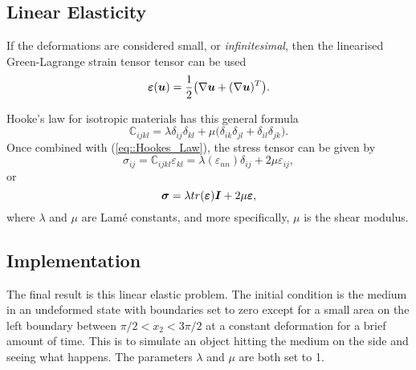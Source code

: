 \subsection{Linear Elasticity}
If the deformations are considered small, or \textit{infinitesimal}, then the linearised Green-Lagrange strain tensor tensor can be used
\begin{equation*}
  \bm{\varepsilon}(\bm{u}) = \frac{1}{2}\big(\nabla\bm{u} + (\nabla\bm{u})^T\big).
\end{equation*}

Hooke's law for isotropic materials has this general formula
\begin{equation*}
  \mathbb{C}_{ijkl} = \lambda\delta_{ij}\delta_{kl} + \mu\big(\delta_{ik}\delta_{jl} + \delta_{il}\delta_{jk}\big).
\end{equation*}
Once combined with (\ref{eq::Hookes_Law}), the stress tensor can be given by
\begin{equation*}
  \sigma_{ij} = \mathbb{C}_{ijkl}\varepsilon_{kl} = \lambda(\varepsilon_{nn})\delta_{ij} + 2\mu\varepsilon_{ij},
\end{equation*}
or
\begin{equation*}
  \bm{\sigma} = \lambda tr(\bm{\varepsilon})\bm{I} + 2\mu\bm{\varepsilon},
\end{equation*}
where $\lambda$ and $\mu$ are Lam\'{e} constants, and more specifically, $\mu$ is the shear modulus. 

\subsection{Implementation}
The final result is this linear elastic problem. The initial condition is the medium in an undeformed state with boundaries set to zero except for a small area on the left boundary between $\pi/2 < x_2 < 3\pi/2$ at a constant deformation for a brief amount of time. This is to simulate an object hitting the medium on the side and seeing what happens. The parameters $\lambda$ and $\mu$ are both set to 1.
